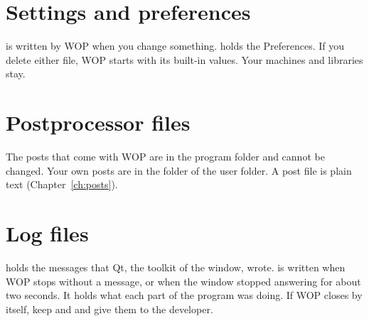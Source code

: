 \section{Settings and preferences}
 is written by WOP when you change something.  holds the Preferences. If you delete either file, WOP starts with its built-in values. Your machines and libraries stay.

\section{Postprocessor files}
The posts that come with WOP are in the program folder and cannot be changed. Your own posts are in the folder  of the user folder. A post file is plain text (Chapter~\ref{ch:posts}).

\section{Log files}
 holds the messages that Qt, the toolkit of the window, wrote.  is written when WOP stops without a message, or when the window stopped answering for about two seconds. It holds what each part of the program was doing. If WOP closes by itself, keep  and  and give them to the developer.
